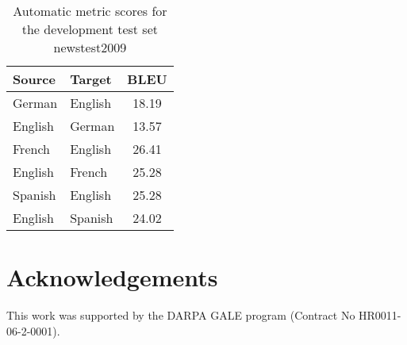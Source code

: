 \documentclass[11pt]{article}
\begin{document}
\begin{table}[h]
\begin{center}
\begin{tabular}{|l|l||c|}
\hline
\bf Source & \bf Target & \bf BLEU  \\
\hline
German & English & 18.19  \\ \hline
English & German & 13.57 \\ \hline
French & English & 26.41 \\ \hline
English & French & 25.28 \\ \hline
Spanish & English & 25.28 \\ \hline
English & Spanish & 24.02  \\ \hline
\end{tabular}
\end{center}
\caption{\label{devtest-scores} Automatic metric scores for the development test set newstest2009}
\end{table}





\section*{Acknowledgements}
This work was supported by the DARPA GALE program (Contract No HR0011-06-2-0001).







\end{document}
